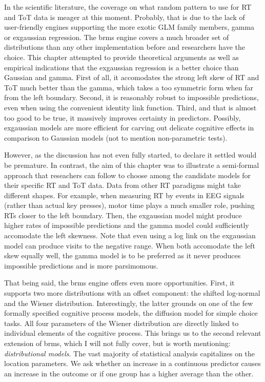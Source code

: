 \documentclass[]{svmono}
\begin{document}
In the scientific literature, the coverage on what random pattern to use
for RT and ToT data is meager at this moment. Probably, that is due to
the lack of user-friendly engines supporting the more exotic GLM family
members, gamma or exgaussian regression. The brms engine covers a much
broader set of distributions than any other implementation before and
researchers have the choice. This chapter attempted to provide
theoretical arguments as well as empirical indications that the
exgaussian regression is a better choice than Gaussian and gamma. First
of all, it accomodates the strong left skew of RT and ToT much better
than the gamma, which takes a too symmetric form when far from the left
boundary. Second, it is reasonably robust to impossible predictions,
even when using the convenient identity link function. Third, and that
is almost too good to be true, it massively improves certainty in
predictors. Possibly, exgaussian models are more efficient for carving
out delicate cognitive effects in comparison to Gaussian models (not to
mention non-parametric tests).

However, as the discussion has not even fully started, to declare it
settled would be premature. In contrast, the aim of this chapter was to
illustrate a semi-formal approach that reseachers can follow to choose
among the candidate models for their specific RT and ToT data. Data from
other RT paradigms might take different shapes. For example, when
measuring RT by events in EEG signals (rather than actual key presses),
motor time plays a much smaller role, pushing RTs closer to the left
boundary. Then, the exgaussian model might produce higher rates of
impossible predictions and the gamma model could sufficiently accomodate
the left skewness. Note that even using a log link on the exgaussian
model can produce visits to the negative range. When both accomodate the
left skew equally well, the gamma model is to be preferred as it never
produces impossible predictions and is more parsimomous.

That being said, the brms engine offers even more opportunities. First,
it supports two more distributions with an offset component: the shifted
log-normal and the Wiener distribution. Interestingly, the latter
grounds on one of the few formally specified cognitive process models,
the diffusion model for simple choice tasks. All four parameters of the
Wiener distribution are directly linked to individual elements of the
cognitive process. This brings us to the second relevant extension of
brms, which I will not fully cover, but is worth mentioning:
\emph{distributional models}. The vast majority of statistical analysis
capitalizes on the location parameters. We ask whether an increase in a
continuous predictor causes an increase in the outcome or if one group
has a higher average than the other.
\end{document}
